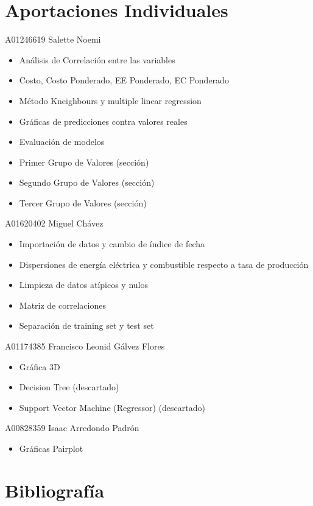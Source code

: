 \documentclass{article}
\begin{document}
\section{Aportaciones Individuales}
A01246619 Salette Noemi
\begin{itemize}
\item Análisis de Correlación entre las variables
\item Costo, Costo Ponderado, EE Ponderado, EC Ponderado
\item Método Kneighbours y multiple linear regression
\item Gráficas de predicciones contra valores reales
\item Evaluación de modelos
\item Primer Grupo de Valores (sección)
\item Segundo Grupo de Valores (sección)
\item Tercer Grupo de Valores (sección)
\end{itemize}

A01620402 Miguel Chávez
\begin{itemize}
\item Importación de datos y cambio de índice de fecha
\item Dispersiones de energía eléctrica y combustible respecto a tasa de producción
\item Limpieza de datos atípicos y nulos
\item Matriz de correlaciones
\item Separación de training set y test set
\end{itemize}
A01174385 Francisco Leonid Gálvez Flores
\begin{itemize}
\item Gráfica 3D
\item Decision Tree (descartado)
\item Support Vector Machine (Regressor) (descartado)
\end{itemize}
A00828359 Isaac Arredondo Padrón
\begin{itemize}
    \item Gráficas Pairplot
\end{itemize}

\section{Bibliografía}



\end{document}
